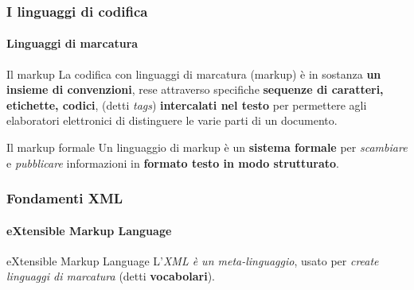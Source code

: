 \begin{frame}
	\frametitle{I linguaggi di codifica}
	\framesubtitle{Linguaggi di marcatura}
	\addtocounter{nframe}{1}

	\begin{block}{Il markup}
		La codifica con linguaggi di marcatura (markup) è in sostanza \textbf{un insieme di convenzioni}, rese attraverso specifiche \textbf{sequenze di caratteri, etichette, codici}, (detti \textit{tags}) \textbf{intercalati nel testo} per permettere agli elaboratori elettronici di distinguere le varie parti di un documento.
	\end{block}

	\begin{block}{Il markup formale}
		Un linguaggio di markup è un \textbf{sistema formale} per \textit{scambiare} e \textit{pubblicare} informazioni in \textbf{formato testo in modo strutturato}.
	\end{block}


\end{frame}




\begin{frame}
	\frametitle{Fondamenti XML}
	\framesubtitle{eXtensible Markup Language}
	\addtocounter{nframe}{1}

	
	\begin{block} {eXtensible Markup Language}
		L'\textit{XML è un meta-linguaggio}, usato per \textit{create linguaggi di marcatura} (detti \textbf{vocabolari}).
	\end{block}
\end{frame}

